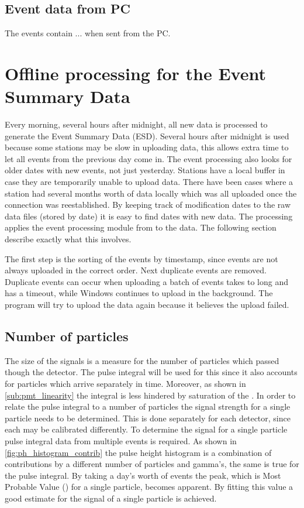 \subsection{Event data from PC}

The events contain ... when sent from the PC.


\section{Offline processing for the Event Summary Data}

Every morning, several hours after midnight, all new data is processed to generate the Event Summary Data (ESD). Several hours after midnight is used because some stations may be slow in uploading data, this allows extra time to let all events from the previous day come in.  The event processing also looks for older dates with new events, not just yesterday. Stations have a local buffer in case they are temporarily unable to upload data. There have been cases where a station had several months worth of data locally which was all uploaded once the connection was reestablished. By keeping track of modification dates to the raw data files (stored by date) it is easy to find dates with new data. The processing applies the event processing module from \sapphire to the data. The following section describe exactly what this involves.

The first step is the sorting of the events by timestamp, since events are not always uploaded in the correct order. Next duplicate events are removed. Duplicate events can occur when uploading a batch of events takes to long and \python has a timeout, while Windows continues to upload in the background. The \python program will try to upload the data again because it believes the upload failed.


\subsection{Number of particles}

The size of the signals is a measure for the number of particles which passed though the detector. The pulse integral will be used for this since it also accounts for particles which arrive separately in time. Moreover, as shown in \cref{sub:pmt_linearity} the integral is less hindered by saturation of the \adcs. In order to relate the pulse integral to a number of particles the signal strength for a single particle needs to be determined. This is done separately for each detector, since each may be calibrated differently. To determine the signal for a single particle pulse integral data from multiple events is required. As shown in \cref{fig:ph_histogram_contrib} the pulse height histogram is a combination of contributions by a different number of particles and gamma's, the same is true for the pulse integral. By taking a day's worth of events the peak, which is Most Probable Value (\mpv) for a single particle, becomes apparent. By fitting this value a good estimate for the signal of a single particle is achieved.


